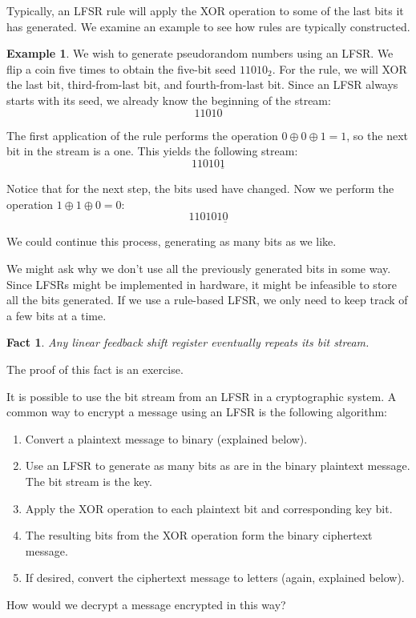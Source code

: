 \documentclass{book}
\theoremstyle{plain}
\newtheorem{fact}[theorem]{Fact}
\theoremstyle{definition}
\newtheorem{example}[theorem]{Example}
\begin{document}
Typically, an LFSR rule will apply the XOR operation to some of the last bits it has generated. We examine an example to see how rules are typically constructed.

\begin{example}
We wish to generate pseudorandom numbers using an LFSR. We flip a coin five times to obtain the five-bit seed $11010_2$. For the rule, we will XOR the last bit, third-from-last bit, and fourth-from-last bit. Since an LFSR always starts with its seed, we already know the beginning of the stream: $$11010$$

The first application of the rule performs the operation $0 \oplus 0 \oplus 1 = 1$, so the next bit in the stream is a one. This yields the following stream: $$11010\underline{1}$$

Notice that for the next step, the bits used have changed. Now we perform the operation $1 \oplus 1 \oplus 0 = 0$: $$110101\underline{0}$$

We could continue this process, generating as many bits as we like.
\end{example}

We might ask why we don't use all the previously generated bits in some way. Since LFSRs might be implemented in hardware, it might be infeasible to store all the bits generated. If we use a rule-based LFSR, we only need to keep track of a few bits at a time.

\begin{fact}
Any linear feedback shift register eventually repeats its bit stream.
\end{fact}

The proof of this fact is an exercise.

It is possible to use the bit stream from an LFSR in a cryptographic system. A common way to encrypt a message using an LFSR is the following algorithm:
\begin{enumerate}
\item Convert a plaintext message to binary (explained below).
\item Use an LFSR to generate as many bits as are in the binary plaintext message. The bit stream is the key.
\item Apply the XOR operation to each plaintext bit and corresponding key bit.
\item The resulting bits from the XOR operation form the binary ciphertext message.
\item If desired, convert the ciphertext message to letters (again, explained below).
\end{enumerate}
How would we decrypt a message encrypted in this way?
\end{document}
